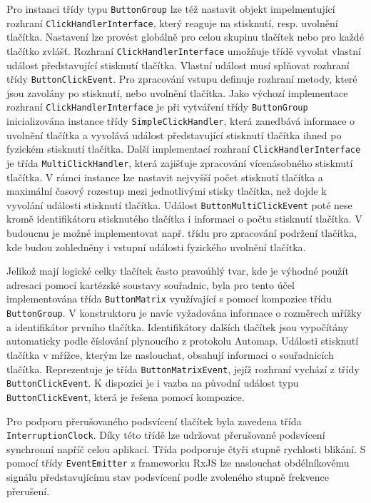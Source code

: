 \documentclass[thesis=M,czech]{FITthesis}[2019/03/06]
\begin{document}
		Pro instanci třídy typu \texttt{ButtonGroup} lze též nastavit objekt impelmentující rozhraní \texttt{Click\-Handler\-Interface}, který reaguje
		na stisknutí, resp. uvolnění tlačítka. Nastavení lze provést globálně pro celou skupinu tlačítek nebo pro každé tlačítko zvlášť.
		Rozhraní \texttt{Click\-Handler\-Interface} umožňuje třídě vyvolat vlastní událost představující stisknutí tlačítka.
		Vlastní událost musí splňovat rozhraní třídy \texttt{Button\-Click\-Event}. Pro zpracování vstupu definuje rozhraní metody,	které jsou zavolány po stisknutí, nebo uvolnění tlačítka.
		Jako výchozí implementace rozhraní \texttt{Click\-Handler\-Interface} je při vytváření třídy \texttt{ButtonGroup} inicializována instance třídy 
		\texttt{Simple\-Click\-Handler}, která zanedbává informace o uvolnění tlačítka a vyvolává událost představující stisknutí tlačítka 
		ihned po fyzickém stisknutí tlačítka. 
		Další implementací rozhraní \texttt{Click\-Handler\-Interface} je třída \texttt{Multi\-Click\-Handler}, která zajišťuje zpracování vícenásobného stisknutí tlačítka. 
		V rámci instance lze nastavit nejvyšší počet stisknutí tlačítka a maximální časový rozestup mezi jednotlivými stisky tlačítka, než dojde k vyvolání události stisknutí tlačítka. 
		Událost \texttt{Button\-Multi\-Click\-Event} poté nese kromě identifikátoru stisknutého tlačítka i informaci o počtu stisknutí tlačítka.
		V budoucnu je možné implementovat např. třídu pro zpracování podržení tlačítka, kde budou zohledněny i vstupní události fyzického uvolnění tlačítka.
		
		Jelikož mají logické celky tlačítek často pravoúhlý tvar, kde je výhodné použít adresaci pomocí
		kartézské soustavy souřadnic, byla pro tento účel implementována třída \texttt{ButtonMatrix} využívající
		s pomocí kompozice třídu \texttt{ButtonGroup}. V konstruktoru je navíc vyžadována informace o rozměrech mřížky a identifikátor prvního tlačítka. 
		Identifikátory dalších tlačítek jsou vypočítány automaticky podle číslování plynoucího z protokolu Automap.
		Události stisknutí tlačítka v mřížce, kterým lze naslouchat, obsahují informaci o souřadnicích tlačítka. Reprezentuje je třída \texttt{Button\-Matrix\-Event},
		jejíž rozhraní vychází z třídy \texttt{Button\-Click\-Event}. K dispozici je i vazba na původní událost typu \texttt{Button\-Click\-Event}, která je řešena pomocí kompozice.
		
		Pro podporu přerušovaného podsvícení tlačítek byla zavedena třída \texttt{Interruption\-Clock}. Díky této třídě lze 
		udržovat přerušované podsvícení synchronní napříč celou aplikací. Třída podporuje čtyři stupně rychlosti blikání.
		S pomocí třídy \texttt{EventEmitter} z frameworku RxJS lze naslouchat obdélníkovému signálu představujícímu stav podsvícení podle zvoleného stupně frekvence přerušení.
\end{document}
